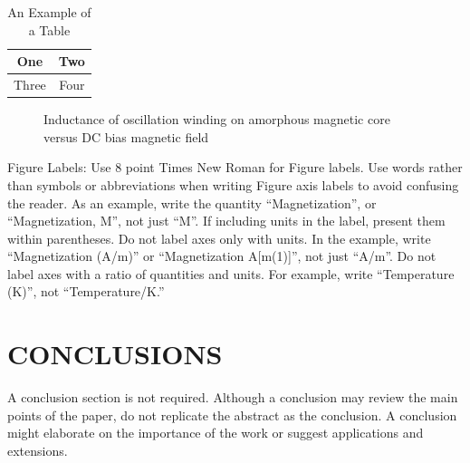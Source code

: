 \documentclass[letterpaper, 10 pt, conference]{ieeeconf}  %
\begin{document}
\begin{table}[h]
\caption{An Example of a Table}
\label{table_example}
\begin{center}
\begin{tabular}{|c||c|}
\hline
One & Two\\
\hline
Three & Four\\
\hline
\end{tabular}
\end{center}
\end{table}


   \begin{figure}[thpb]
      \centering
      \caption{Inductance of oscillation winding on amorphous
       magnetic core versus DC bias magnetic field}
      \label{figurelabel}
   \end{figure}
   

Figure Labels: Use 8 point Times New Roman for Figure labels. Use words rather than symbols or abbreviations when writing Figure axis labels to avoid confusing the reader. As an example, write the quantity ``Magnetization'', or ``Magnetization, M'', not just ``M''. If including units in the label, present them within parentheses. Do not label axes only with units. In the example, write ``Magnetization (A/m)'' or ``Magnetization {A[m(1)]}'', not just ``A/m''. Do not label axes with a ratio of quantities and units. For example, write ``Temperature (K)'', not ``Temperature/K.''

\section{CONCLUSIONS}

A conclusion section is not required. Although a conclusion may review the main points of the paper, do not replicate the abstract as the conclusion. A conclusion might elaborate on the importance of the work or suggest applications and extensions. 

\addtolength{\textheight}{-12cm}   %
\end{document}
